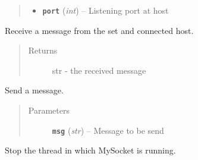 \documentclass[letterpaper,10pt,english]{sphinxmanual}
\begin{document}
\begin{fulllineitems}
\begin{fulllineitems}
\begin{fulllineitems}
\begin{quote}
\begin{description}
\begin{itemize}
\item {} 
\textbf{\texttt{port}} (\emph{int}) -- Listening port at host

\end{itemize}

\end{description}\end{quote}

\end{fulllineitems}


\begin{fulllineitems}
\label{_static/facereader:FaceReader.FaceReader.MySocket.receive}
Receive a message from the set and connected host.
\begin{quote}\begin{description}
\item[{Returns}] \leavevmode
str - the received message

\end{description}\end{quote}

\end{fulllineitems}


\begin{fulllineitems}
\label{_static/facereader:FaceReader.FaceReader.MySocket.send}
Send a message.
\begin{quote}\begin{description}
\item[{Parameters}] \leavevmode
\textbf{\texttt{msg}} (\emph{str}) -- Message to be send

\end{description}\end{quote}

\end{fulllineitems}


\begin{fulllineitems}
\label{_static/facereader:FaceReader.FaceReader.MySocket.stop}
Stop the thread in which MySocket is running.

\end{fulllineitems}



\end{fulllineitems}
\end{fulllineitems}
\end{document}
